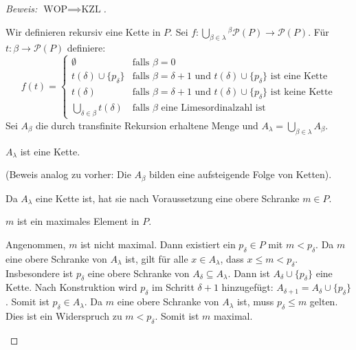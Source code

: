 \begin{proof}[Beweis: $\text{WOP} \implies \text{KZL}$]
\begin{math-stroke}
Wir definieren rekursiv eine Kette in $P$.
Sei $f: \bigcup_{\beta \in \lambda} {}^{\beta}\mathcal{P}(P) \to \mathcal{P}(P)$.
Für $t: \beta \to \mathcal{P}(P)$ definiere:
\[
f(t) = \begin{cases}
\emptyset & \text{falls } \beta = 0 \\
t(\delta) \cup \{p_\delta\} & \text{falls } \beta = \delta+1 \text{ und } t(\delta) \cup \{p_\delta\} \text{ ist eine Kette} \\
t(\delta) & \text{falls } \beta = \delta+1 \text{ und } t(\delta) \cup \{p_\delta\} \text{ ist keine Kette} \\
\bigcup_{\delta \in \beta} t(\delta) & \text{falls } \beta \text{ eine Limesordinalzahl ist}
\end{cases}
\]
Sei $A_\beta$ die durch transfinite Rekursion erhaltene Menge und $A_\lambda = \bigcup_{\beta \in \lambda} A_\beta$.

\begin{claim}
$A_\lambda$ ist eine Kette.
\end{claim}
(Beweis analog zu vorher: Die $A_\beta$ bilden eine aufsteigende Folge von Ketten).

Da $A_\lambda$ eine Kette ist, hat sie nach Voraussetzung eine obere Schranke $m \in P$.

\begin{claim}
$m$ ist ein maximales Element in $P$.
\end{claim}
\begin{short-proof}
Angenommen, $m$ ist nicht maximal. Dann existiert ein $p_\delta \in P$ mit $m < p_\delta$.
Da $m$ eine obere Schranke von $A_\lambda$ ist, gilt für alle $x \in A_\lambda$, dass $x \le m < p_\delta$.
Insbesondere ist $p_\delta$ eine obere Schranke von $A_\delta \subseteq A_\lambda$.
Dann ist $A_\delta \cup \{p_\delta\}$ eine Kette.
Nach Konstruktion wird $p_\delta$ im Schritt $\delta+1$ hinzugefügt: $A_{\delta+1} = A_\delta \cup \{p_\delta\}$.
Somit ist $p_\delta \in A_\lambda$.
Da $m$ eine obere Schranke von $A_\lambda$ ist, muss $p_\delta \le m$ gelten.
Dies ist ein Widerspruch zu $m < p_\delta$.
Somit ist $m$ maximal.
\end{short-proof}
\end{math-stroke}
\end{proof}

\begin{ai-global-state-checkpoint-invisible-content}
\end{ai-global-state-checkpoint-invisible-content}

